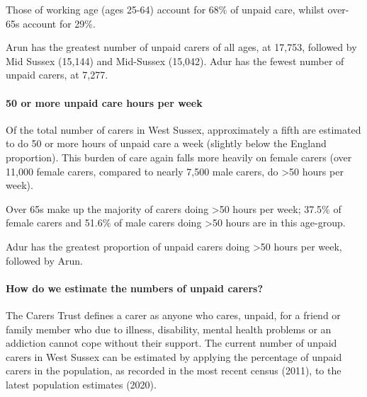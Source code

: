 Those of working age (ages 25-64) account for 68\% of unpaid care, whilst over- 65s account for 29\%.

Arun has the greatest number of unpaid carers of all ages, at 17,753, followed by Mid Sussex (15,144) and Mid-Sussex (15,042). Adur has the fewest number of unpaid carers, at 7,277.

\paragraph{50 or more unpaid care hours per week}Of the total number of carers in West Sussex, approximately a fifth are estimated to do 50 or more hours of unpaid care a week (slightly below the England proportion). This burden of care again falls more heavily on female carers (over 11,000 female carers, compared to nearly 7,500 male carers, do >50 hours per week).

Over 65s make up the majority of carers doing >50 hours per week; 37.5\% of female carers and 51.6\% of male carers doing >50 hours are in this age-group.

Adur has the greatest proportion of unpaid carers doing >50 hours per week, followed by Arun.

\paragraph{How do we estimate the numbers of unpaid carers?} The Carers Trust defines a carer as anyone who cares, unpaid, for a friend or family member who due to illness, disability, mental health problems or an addiction cannot cope without their support. The current number of unpaid carers in West Sussex can be estimated by applying the percentage of unpaid carers in the population, as recorded in the most recent census (2011), to the latest population estimates (2020).

\newpage

